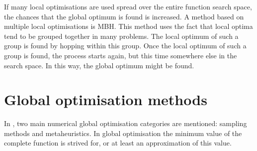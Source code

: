If many local optimisations are used spread over the entire function search space, the chances that the global optimum is found is increased. A method based on multiple local optimisations is \acf{MBH}. This method uses the fact that local optima tend to be grouped together in many problems. The local optimum of such a group is found by hopping within this group. Once the local optimum of such a group is found, the process starts again, but this time somewhere else in the search space. In this way, the global optimum might be found.



\section{Global optimisation methods}
\label{sec:diffmethglo}
In \cite{noomen2013}, two main numerical global optimisation categories are mentioned: sampling methods and metaheuristics. In global optimisation the minimum value of the complete function is strived for, or at least an approximation of this value.



